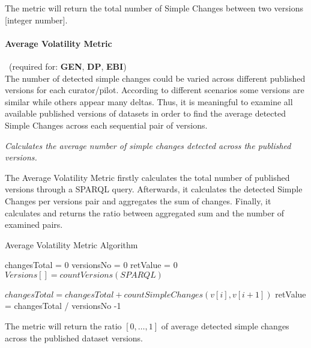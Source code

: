 The metric will return the total number of Simple Changes between two versions [integer number].

\paragraph{Average Volatility Metric}~(required for: \textbf{GEN}, \textbf{DP}, \textbf{EBI})~\\ %
The number of detected simple changes could be varied across different published versions for each curator/pilot. According to different scenarios some versions are similar while others appear many deltas. Thus, it is meaningful to examine all available published versions of datasets in order to find the average detected Simple Changes across each sequential pair of versions. 

\begin{mdframed}[style=metricdefinition]
\emph{Calculates the average number of simple changes detected across the published versions.}
\end{mdframed}

The Average Volatility Metric firstly calculates the total number of published versions through a SPARQL query. Afterwards, it calculates the detected Simple Changes per versions pair and aggregates the sum of changes. Finally, it calculates and returns the ratio between aggregated sum and the number of examined pairs.

\begin{algorithm}
\caption{Average Volatility Metric Algorithm}
\begin{algorithmic}[1]

\State changesTotal = 0
\State versionsNo = 0
\State retValue = 0
\EndProcedure
{}
\State $ Versions [] = countVersions (SPARQL)$

\State $changesTotal = changesTotal + countSimpleChanges(v[i],v[i+1])$
\EndFor
\EndProcedure
\State retValue = changesTotal / versionsNo -1
\end{algorithmic}
\end{algorithm}

The metric will return the ratio $[0,\ldots,1]$ of average detected simple changes across the published dataset versions. 

